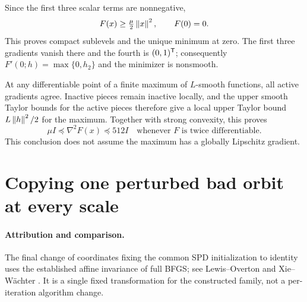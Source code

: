 Since the first three scalar terms are nonnegative,
\[
 F(x)\ge\tfrac\mu2\left\lVert x\right\rVert^2,\qquad F(0)=0.
\]
This proves compact sublevels and the unique minimum at zero. The first three gradients vanish there and the fourth is $(0,1)^{\mathsf T}$; consequently $F'(0;h)=\max\{0,h_2\}$ and the minimizer is nonsmooth.

At any differentiable point of a finite maximum of $L$-smooth functions, all active gradients agree. Inactive pieces remain inactive locally, and the upper smooth Taylor bounds for the active pieces therefore give a local upper Taylor bound $L\left\lVert h\right\rVert^2/2$ for the maximum. Together with strong convexity, this proves
\begin{equation}\label{L:eq:Hbounds}
 \mu I\preceq\nabla^2F(x)\preceq512I
 \quad\text{whenever }F\text{ is twice differentiable}.
\end{equation}
This conclusion does not assume the maximum has a globally Lipschitz gradient.


\setcounter{section}{5}
\setcounter{theorem}{2}
\setcounter{lemma}{2}
\setcounter{corollary}{0}
\setcounter{proposition}{0}
\setcounter{remark}{0}
\setcounter{equation}{7}
\section{Copying one perturbed bad orbit at every scale}
\paragraph{Attribution and comparison.}
The final change of coordinates fixing the common SPD initialization to identity uses the established affine invariance of full BFGS; see Lewis--Overton \cite[Section 2]{LO} and Xie--W\"achter \cite[Theorem II.1]{XW}. It is a single fixed transformation for the constructed family, not a per-iteration algorithm change.

